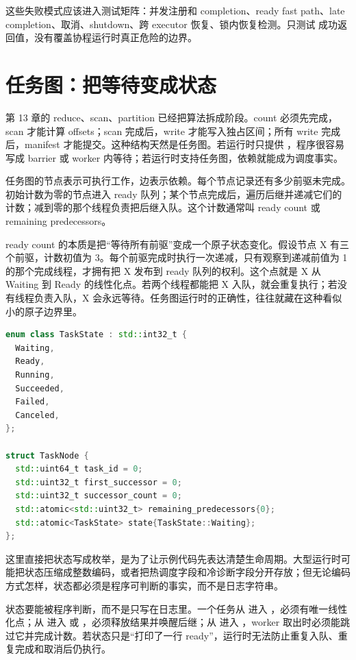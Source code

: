 这些失败模式应该进入测试矩阵：并发注册和 completion、ready fast path、late completion、取消、shutdown、跨 executor 恢复、锁内恢复检测。只测试  成功返回值，没有覆盖协程运行时真正危险的边界。

\section{任务图：把等待变成状态}

第 13 章的 reduce、scan、partition 已经把算法拆成阶段。count 必须先完成，scan 才能计算 offsets；scan 完成后，write 才能写入独占区间；所有 write 完成后，manifest 才能提交。这种结构天然是任务图。若运行时只提供 ，程序很容易写成 barrier 或 worker 内等待；若运行时支持任务图，依赖就能成为调度事实。

任务图的节点表示可执行工作，边表示依赖。每个节点记录还有多少前驱未完成。初始计数为零的节点进入 ready 队列；某个节点完成后，遍历后继并递减它们的计数；减到零的那个线程负责把后继入队。这个计数通常叫 ready count 或 remaining predecessors。

ready count 的本质是把“等待所有前驱”变成一个原子状态变化。假设节点 X 有三个前驱，计数初值为 3。每个前驱完成时执行一次递减，只有观察到递减前值为 1 的那个完成线程，才拥有把 X 发布到 ready 队列的权利。这个点就是 X 从 Waiting 到 Ready 的线性化点。若两个线程都能把 X 入队，就会重复执行；若没有线程负责入队，X 会永远等待。任务图运行时的正确性，往往就藏在这种看似小的原子边界里。

\begin{lstlisting}[language=C++,caption={任务图节点的核心调度字段}]
enum class TaskState : std::int32_t {
  Waiting,
  Ready,
  Running,
  Succeeded,
  Failed,
  Canceled,
};

struct TaskNode {
  std::uint64_t task_id = 0;
  std::uint32_t first_successor = 0;
  std::uint32_t successor_count = 0;
  std::atomic<std::uint32_t> remaining_predecessors{0};
  std::atomic<TaskState> state{TaskState::Waiting};
};
\end{lstlisting}

这里直接把状态写成枚举，是为了让示例代码先表达清楚生命周期。大型运行时可能把状态压缩成整数编码，或者把热调度字段和冷诊断字段分开存放；但无论编码方式怎样，状态都必须是程序可判断的事实，而不是日志字符串。

状态要能被程序判断，而不是只写在日志里。一个任务从  进入 ，必须有唯一线性化点；从  进入  或 ，必须释放结果并唤醒后继；从  进入 ，worker 取出时必须能跳过它并完成计数。若状态只是“打印了一行 ready”，运行时无法防止重复入队、重复完成和取消后仍执行。

